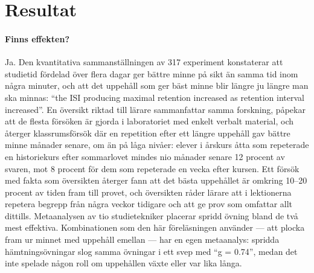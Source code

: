 \section{Resultat}
\label{sec:recap-spacing-resultat}

\paragraph{Finns effekten?}
Ja.  Den kvantitativa sammanställningen av 317 experiment konstaterar att
studietid fördelad över flera dagar ger bättre minne på sikt än samma tid
inom några minuter, och att det uppehåll som ger bäst minne blir längre
ju längre man ska minnas: \enquote{the ISI producing maximal retention
increased as retention interval
increased}\autocite[354]{Cepeda2006Distributed}.
En översikt riktad till lärare sammanfattar samma forskning, påpekar att
de flesta försöken är gjorda i laboratoriet med enkelt verbalt material,
och återger klassrumsförsök där en repetition efter ett längre uppehåll
gav bättre minne månader senare, om än på låga nivåer: elever i årskurs
åtta som repeterade en historiekurs efter sommarlovet mindes nio månader
senare 12 procent av svaren, mot 8 procent för dem som repeterade en
vecka efter kursen\autocite[371--372]{Carpenter2012Spacing}.
Ett försök med fakta som översikten återger fann att det bästa uppehållet
är omkring 10--20 procent av tiden fram till provet, och översikten råder
lärare att i lektionerna repetera begrepp från några veckor tidigare och
att ge prov som omfattar allt
dittills\autocite[374--375]{Carpenter2012Spacing}.
Metaanalysen av tio studietekniker placerar spridd övning bland de två
mest effektiva\autocite{DonoghueHattie2021}.  Kombinationen som den här
föreläsningen använder --- att plocka fram ur minnet med uppehåll
emellan --- har en egen metaanalys: spridda hämtningsövningar slog samma
övningar i ett svep med \enquote{g = 0.74}, medan det inte spelade någon
roll om uppehållen växte eller var lika långa\autocite{Latimier2021Spaced}.

